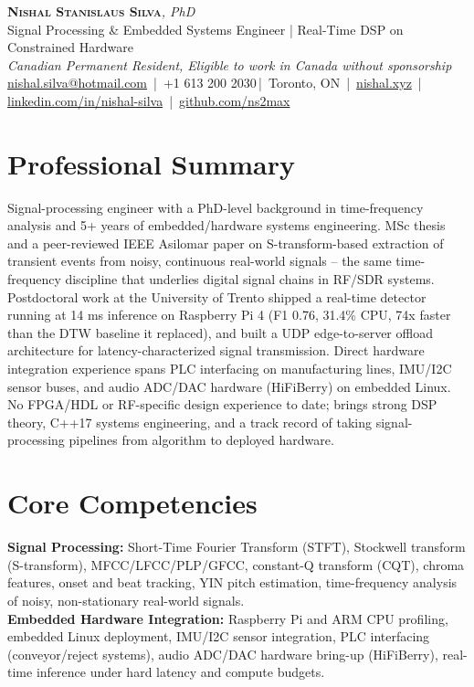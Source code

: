 \documentclass[11pt]{article}
\makeatletter
\newcommand{\cvName}{Nishal Stanislaus Silva}
\newcommand{\cvEmail}{nishal.silva@hotmail.com}
\newcommand{\cvPhone}{+1 613 200 2030}
\newcommand{\cvCity}{Toronto, ON}
\newcommand{\cvSite}{https://nishal.xyz}
\newcommand{\cvLinkedIn}{https://www.linkedin.com/in/nishal-silva}
\newcommand{\cvGitHub}{https://github.com/ns2max}
\newcommand{\cvStatus}{Canadian Permanent Resident, Eligible to work in Canada without sponsorship}
\newcommand{\cvTagline}{Signal Processing \& Embedded Systems Engineer | Real-Time DSP on Constrained Hardware}
\makeatother
\begin{document}
\pagestyle{empty}
\begin{center}
    {\LARGE \scshape \textbf{\cvName}}{\large \textit{, PhD}}\\[1pt]
    {\small \cvTagline}\\[1pt]
    {\footnotesize\textit{\cvStatus}}\\[1pt]
    {\small
    \href{mailto:\cvEmail}{\cvEmail} \,|\, \cvPhone \,|\, \cvCity
    \,|\, \href{\cvSite}{nishal.xyz} \,|\, \href{\cvLinkedIn}{linkedin.com/in/nishal-silva}
    \,|\, \href{\cvGitHub}{github.com/ns2max}}
\end{center}

\section*{Professional Summary}
Signal-processing engineer with a PhD-level background in time-frequency analysis and 5+ years of embedded/hardware systems engineering. MSc thesis and a peer-reviewed IEEE Asilomar paper on S-transform-based extraction of transient events from noisy, continuous real-world signals -- the same time-frequency discipline that underlies digital signal chains in RF/SDR systems. Postdoctoral work at the University of Trento shipped a real-time detector running at 14 ms inference on Raspberry Pi 4 (F1 0.76, 31.4\% CPU, 74x faster than the DTW baseline it replaced), and built a UDP edge-to-server offload architecture for latency-characterized signal transmission. Direct hardware integration experience spans PLC interfacing on manufacturing lines, IMU/I2C sensor buses, and audio ADC/DAC hardware (HiFiBerry) on embedded Linux. No FPGA/HDL or RF-specific design experience to date; brings strong DSP theory, C++17 systems engineering, and a track record of taking signal-processing pipelines from algorithm to deployed hardware.

\section*{Core Competencies}
\textbf{Signal Processing:} Short-Time Fourier Transform (STFT), Stockwell transform (S-transform), MFCC/LFCC/PLP/GFCC, constant-Q transform (CQT), chroma features, onset and beat tracking, YIN pitch estimation, time-frequency analysis of noisy, non-stationary real-world signals. \\
\textbf{Embedded Hardware Integration:} Raspberry Pi and ARM CPU profiling, embedded Linux deployment, IMU/I2C sensor integration, PLC interfacing (conveyor/reject systems), audio ADC/DAC hardware bring-up (HiFiBerry), real-time inference under hard latency and compute budgets.
\end{document}
